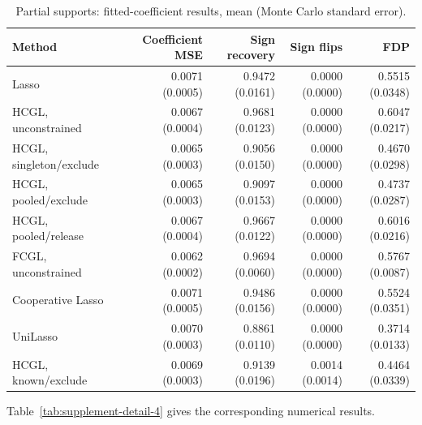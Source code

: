 \documentclass[11pt,a4paper]{article}
\begin{document}
\begin{table}[htbp]\centering\small\setlength{\tabcolsep}{4pt}
\caption{Partial supports: fitted-coefficient results, mean (Monte Carlo standard error).}
\begin{tabular}{lrrrr}\toprule
Method & Coefficient MSE & Sign recovery & Sign flips & FDP\\\midrule
Lasso & 0.0071 (0.0005) & 0.9472 (0.0161) & 0.0000 (0.0000) & 0.5515 (0.0348) \\
HCGL, unconstrained & 0.0067 (0.0004) & 0.9681 (0.0123) & 0.0000 (0.0000) & 0.6047 (0.0217) \\
HCGL, singleton/exclude & 0.0065 (0.0003) & 0.9056 (0.0150) & 0.0000 (0.0000) & 0.4670 (0.0298) \\
HCGL, pooled/exclude & 0.0065 (0.0003) & 0.9097 (0.0153) & 0.0000 (0.0000) & 0.4737 (0.0287) \\
HCGL, pooled/release & 0.0067 (0.0004) & 0.9667 (0.0122) & 0.0000 (0.0000) & 0.6016 (0.0216) \\
FCGL, unconstrained & 0.0062 (0.0002) & 0.9694 (0.0060) & 0.0000 (0.0000) & 0.5767 (0.0087) \\
Cooperative Lasso & 0.0071 (0.0005) & 0.9486 (0.0156) & 0.0000 (0.0000) & 0.5524 (0.0351) \\
UniLasso & 0.0070 (0.0003) & 0.8861 (0.0110) & 0.0000 (0.0000) & 0.3714 (0.0133) \\
HCGL, known/exclude & 0.0069 (0.0003) & 0.9139 (0.0196) & 0.0014 (0.0014) & 0.4464 (0.0339) \\
\bottomrule\end{tabular}
\label{tab:supplement-detail-3}
\end{table}

\noindent Table~\ref{tab:supplement-detail-4} gives the corresponding numerical results.
\end{document}
